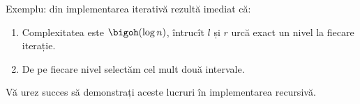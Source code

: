 Exemplu: din implementarea iterativă rezultă imediat că:

\begin{enumerate}
  \item  Complexitatea este $\bigoh(\log n)$, întrucît $l$ și $r$ urcă exact un nivel la fiecare iterație.

  \item De pe fiecare nivel selectăm cel mult două intervale.
\end{enumerate}

Vă urez succes să demonstrați aceste lucruri în implementarea recursivă. 
